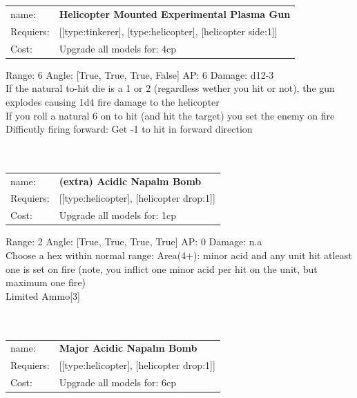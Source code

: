 \ \\
\ \\
\begin{tabular}{ll}
name: & {\bf Helicopter Mounted Experimental Plasma Gun } \\
Requiers: & [[type:tinkerer], [type:helicopter], [helicopter side:1]] \\
Cost: & Upgrade all models for: 4cp \\
\end{tabular}



Range: 6  Angle: [True, True, True, False] AP: 6 Damage: d12-3 \\
If the natural to-hit die is a 1 or 2 (regardless wether you hit or not), the gun explodes causing 1d4 fire damage to the helicopter\\ 
If you roll a natural 6 on to hit (and hit the target) you set the enemy on fire\\ 
Difficutly firing forward: Get -1 to hit in forward direction\\ 








\ \\
\ \\
\begin{tabular}{ll}
name: & {\bf (extra) Acidic Napalm Bomb } \\
Requiers: & [[type:helicopter], [helicopter drop:1]] \\
Cost: & Upgrade all models for: 1cp \\
\end{tabular}



Range: 2  Angle: [True, True, True, True] AP: 0 Damage: n.a \\
Choose a hex within normal range: Area(4+): minor acid and any unit hit atleast one is set on fire (note, you inflict one minor acid per hit on the unit, but maximum one fire)\\ 
Limited Ammo[3]\\ 








\ \\
\ \\
\begin{tabular}{ll}
name: & {\bf Major Acidic Napalm Bomb } \\
Requiers: & [[type:helicopter], [helicopter drop:1]] \\
Cost: & Upgrade all models for: 6cp \\
\end{tabular}



